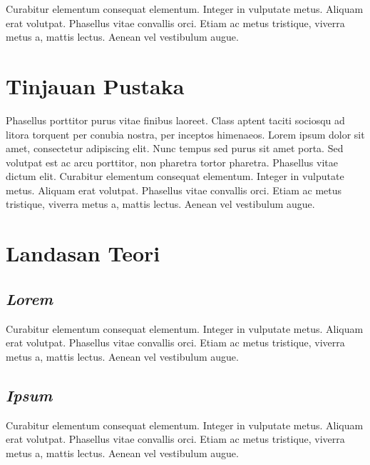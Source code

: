 

Curabitur elementum consequat elementum. Integer in vulputate
metus. Aliquam erat volutpat. Phasellus vitae convallis orci. Etiam ac
metus tristique, viverra metus a, mattis lectus. Aenean vel vestibulum
augue.

\section{Tinjauan Pustaka}

Phasellus porttitor purus \textcite{warn} vitae finibus laoreet. Class
aptent taciti sociosqu ad litora torquent per conubia nostra, per
inceptos himenaeos. Lorem ipsum dolor sit amet, consectetur adipiscing
elit. Nunc tempus sed purus sit amet porta. Sed volutpat est ac arcu
porttitor, non pharetra tortor pharetra. Phasellus vitae dictum
elit. Curabitur elementum consequat elementum. Integer in vulputate
metus. Aliquam erat volutpat. Phasellus vitae convallis orci. Etiam ac
metus tristique, viverra metus a, mattis lectus. Aenean vel vestibulum
augue.

\section{Landasan Teori}


\subsection{\emph{Lorem}}
\label{subsec:label}

Curabitur elementum consequat elementum. Integer in vulputate
metus. Aliquam erat volutpat. Phasellus vitae convallis orci. Etiam ac
metus tristique, viverra metus a, mattis lectus. Aenean vel vestibulum
augue.

\subsection{\emph{Ipsum}}
\label{subsec:label}

Curabitur elementum consequat elementum. Integer in vulputate
metus. Aliquam erat volutpat. Phasellus vitae convallis orci. Etiam ac
metus tristique, viverra metus a, mattis lectus. Aenean vel vestibulum
augue.

